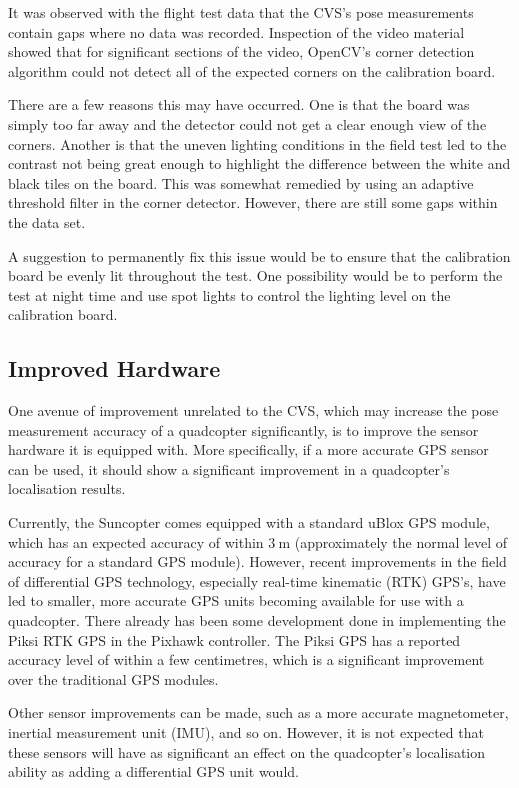 It was observed with the flight test data that the CVS's pose measurements contain gaps where no data was recorded. Inspection of the video material showed that for significant sections of the video, OpenCV's corner detection algorithm could not detect all of the expected corners on the calibration board. 

There are a few reasons this may have occurred. One is that the board was simply too far away and the detector could not get a clear enough view of the corners. Another is that the uneven lighting conditions in the field test led to the contrast not being great enough to highlight the difference between the white and black tiles on the board. This was somewhat remedied by using an adaptive threshold filter in the corner detector. However, there are still some gaps within the data set. 

A suggestion to permanently fix this issue would be to ensure that the calibration board be evenly lit throughout the test. One possibility would be to perform the test at night time and use spot lights to control the lighting level on the calibration board. 

\subsection{Improved Hardware}

One avenue of improvement unrelated to the CVS, which may increase the pose measurement accuracy of a quadcopter significantly, is to improve the sensor hardware it is equipped with. More specifically, if a more accurate GPS sensor can be used, it should show a significant improvement in a quadcopter's localisation results. 

Currently, the Suncopter comes equipped with a standard uBlox GPS module, which has an expected accuracy of within $\SI{3}{\m}$ (approximately the normal level of accuracy for a standard GPS module). However, recent improvements in the field of differential GPS technology, especially real-time kinematic (RTK) GPS's, have led to smaller, more accurate GPS units becoming available for use with a quadcopter. There already has been some development done in implementing the Piksi RTK GPS in the Pixhawk controller. The Piksi GPS has a reported accuracy level of within a few centimetres, which is a significant improvement over the traditional GPS modules. 

Other sensor improvements can be made, such as a more accurate magnetometer, inertial measurement unit (IMU), and so on. However, it is not expected that these sensors will have as significant an effect on the quadcopter's localisation ability as adding a differential GPS unit would. 

